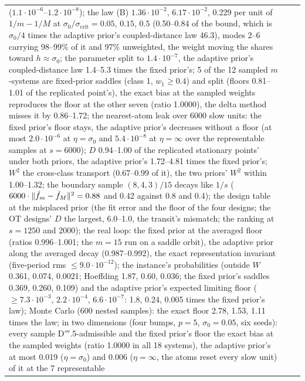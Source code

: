 {\begin{longtable}{@{}>{\raggedright\arraybackslash}p{}>{\raggedright\arraybackslash}p{}%
>{\raggedright\arraybackslash}p{}@{}}
  ($1.1\cdot10^{-6}$--$1.2\cdot10^{-8}$); the law (B) $1.36\cdot10^{-2}$, $6.17\cdot10^{-2}$, 0.229 per unit of
  $1/m - 1/M$ at $\sigma_0/\sigma_{\mathrm{crit}} = 0.05$, $0.15$, $0.5$ (0.50--0.84 of the bound, which is
  $\sigma_0/4$ times the adaptive prior's coupled-distance law 46.3), modes 2--6 carrying 98--99\% of it and 97\%
  unweighted, the weight moving the shares toward $h\approx\sigma_0$; the parameter split to $1.4\cdot10^{-7}$, the
  adaptive prior's coupled-distance law 1.4--5.3 times the fixed prior's; 5 of the 12 sampled $m$-systems are
  fixed-prior saddles (class 1, $w_1\ge0.4$) and split (floors 0.81--1.01 of the replicated point's), the exact bias at
  the sampled weights reproduces the floor at the other seven (ratio 1.0000), the delta method misses it by
  0.86--1.72; the nearest-atom leak over 6000 slow units: the fixed prior's floor stays, the adaptive prior's
  decreases without a floor (at most $2.0\cdot10^{-6}$ at $\eta = \sigma_0$ and $5.4\cdot10^{-8}$ at $\eta = \infty$
  over the representable samples at $s = 6000$); $D$ 0.94--1.00 of the replicated stationary points' under both
  priors, the adaptive prior's 1.72--4.81 times the fixed prior's; $W^2$ the cross-class transport (0.67--0.99 of it),
  the two priors' $W^2$ within 1.00--1.32; the boundary sample $(8,4,3)/15$ decays like $1/s$
  ($6000\cdot\lVert \hat f_m - \hat f_M\rVert^2 = 0.88$ and 0.42 against 0.8 and 0.4); the design table at the misplaced prior
  (the fit error and the floor of the four designs; the OT designs' $D$ the largest, 6.0--1.0, the transit's mismatch;
  the ranking at $s = 1250$ and 2000); the real loop: the fixed prior at the averaged floor (ratios 0.996--1.001; the
  $m = 15$ run on a saddle orbit), the adaptive prior along the averaged decay (0.987--0.992), the exact representation
  invariant (five-period rms $\le9.0\cdot10^{-12}$); the instance's probabilities (outside $W$ 0.361, 0.074, 0.0021;
  Hoeffding 1.87, 0.60, 0.036; the fixed prior's saddles 0.369, 0.260, 0.109) and the adaptive prior's expected
  limiting floor ($\ge7.3\cdot10^{-3}$, $2.2\cdot10^{-4}$, $6.6\cdot10^{-7}$: 1.8, 0.24, 0.005 times the fixed
  prior's law); Monte Carlo (600 nested samples): the exact floor 2.78, 1.53, 1.11 times the law; in two dimensions
  (four bumps, $p = 5$, $\sigma_0 = 0.05$, six seeds): every sample D$'''$.5-admissible and the fixed prior's floor
  the exact bias at the sampled weights (ratio 1.0000 in all 18 systems), the adaptive prior's at most 0.019
  ($\eta = \sigma_0$) and 0.006 ($\eta = \infty$, the atoms reset every slow unit) of it at the 7 representable

\end{longtable}}

